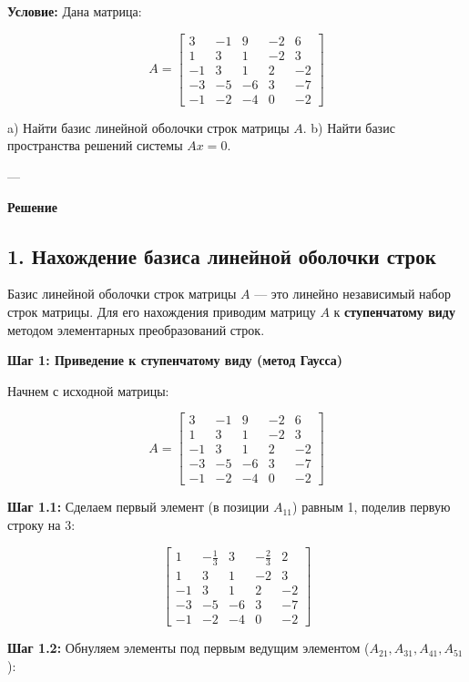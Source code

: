 \textbf{Условие:}  
Дана матрица:

\[
A =
\begin{bmatrix}
3 & -1 & 9 & -2 & 6 \\
1 & 3 & 1 & -2 & 3 \\
-1 & 3 & 1 & 2 & -2 \\
-3 & -5 & -6 & 3 & -7 \\
-1 & -2 & -4 & 0 & -2
\end{bmatrix}
\]

a) Найти базис линейной оболочки строк матрицы \( A \).  
b) Найти базис пространства решений системы \( Ax = 0 \).

---

\textbf{Решение}  

\subsection*{1. Нахождение базиса линейной оболочки строк}  

Базис линейной оболочки строк матрицы \( A \) — это линейно независимый набор строк матрицы. Для его нахождения приводим матрицу \( A \) к \textbf{ступенчатому виду} методом элементарных преобразований строк.

\textbf{Шаг 1: Приведение к ступенчатому виду (метод Гаусса)}  

Начнем с исходной матрицы:

\[
A =
\begin{bmatrix}
3 & -1 & 9 & -2 & 6 \\
1 & 3 & 1 & -2 & 3 \\
-1 & 3 & 1 & 2 & -2 \\
-3 & -5 & -6 & 3 & -7 \\
-1 & -2 & -4 & 0 & -2
\end{bmatrix}
\]

\textbf{Шаг 1.1:} Сделаем первый элемент (в позиции \( A_{11} \)) равным 1, поделив первую строку на 3:

\[
\begin{bmatrix}
1 & -\frac{1}{3} & 3 & -\frac{2}{3} & 2 \\
1 & 3 & 1 & -2 & 3 \\
-1 & 3 & 1 & 2 & -2 \\
-3 & -5 & -6 & 3 & -7 \\
-1 & -2 & -4 & 0 & -2
\end{bmatrix}
\]

\textbf{Шаг 1.2:} Обнуляем элементы под первым ведущим элементом (\( A_{21}, A_{31}, A_{41}, A_{51} \)):

